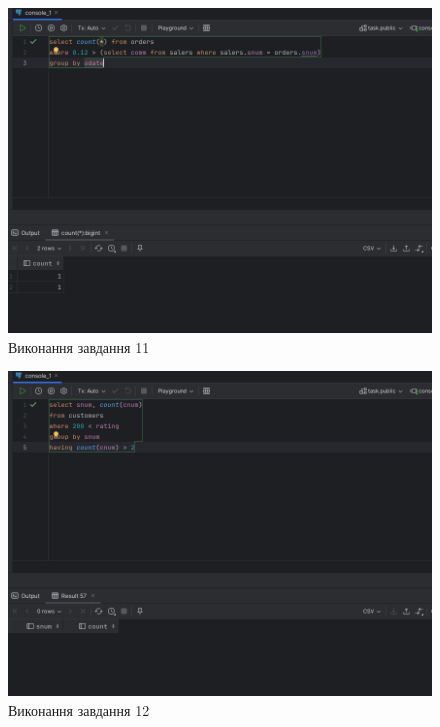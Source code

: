 \documentclass[14pt]{extreport}
\begin{document}
\begin{normalsize}
	\begin{figure}[H]
		\centering
		\includegraphics[scale=0.45]{11}
		\caption{Виконання завдання 11}
	\end{figure}
	
	\begin{figure}[H]
		\centering
		\includegraphics[scale=0.45]{12}
		\caption{Виконання завдання 12}
	\end{figure}
	

\end{normalsize}
\end{document}
